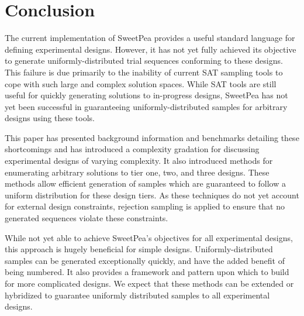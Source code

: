 
\chapter{Conclusion}

The current implementation of SweetPea provides a useful standard language for defining experimental designs. However, it has not yet fully achieved its objective to generate uniformly-distributed trial sequences conforming to these designs. This failure is due primarily to the inability of current SAT sampling tools to cope with such large and complex solution spaces. While SAT tools are still useful for quickly generating solutions to in-progress designs, SweetPea has not yet been successful in guaranteeing uniformly-distributed samples for arbitrary designs using these tools.

This paper has presented background information and benchmarks detailing these shortcomings and has introduced a complexity gradation for discussing experimental designs of varying complexity. It also introduced methods for enumerating arbitrary solutions to tier one, two, and three designs. These methods allow efficient generation of samples which are guaranteed to follow a uniform distribution for these design tiers. As these techniques do not yet account for external design constraints, rejection sampling is applied to ensure that no generated sequences violate these constraints.

While not yet able to achieve SweetPea's objectives for all experimental designs, this approach is hugely beneficial for simple designs. Uniformly-distributed samples can be generated exceptionally quickly, and have the added benefit of being numbered. It also provides a framework and pattern upon which to build for more complicated designs. We expect that these methods can be extended or hybridized to guarantee uniformly distributed samples to all experimental designs.
